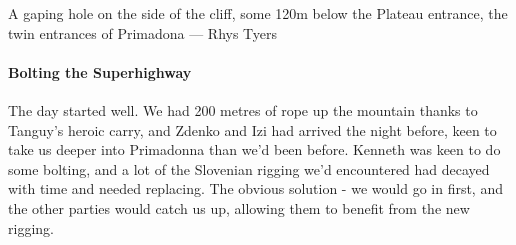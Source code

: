\begin{marginfigure}
\checkoddpage \ifoddpage \forcerectofloat \else \forceversofloat \fi
\centering
{}
\caption{A gaping hole on the side of the cliff, some 120m below the Plateau entrance, the twin entrances of Primadona --- Rhys Tyers}
\label{prima entrance}
\end{marginfigure}
\paragraph{Bolting the Superhighway}
The day started well. We had 200 metres of rope up the mountain thanks to Tanguy’s heroic carry, and Zdenko and Izi had arrived the night before, keen to take us deeper into Primadonna than we’d been before. Kenneth was keen to do some bolting, and a lot of the Slovenian rigging we’d encountered had decayed with time and needed replacing. The obvious solution - we would go in first, and the other parties would catch us up, allowing them to benefit from the new rigging.

